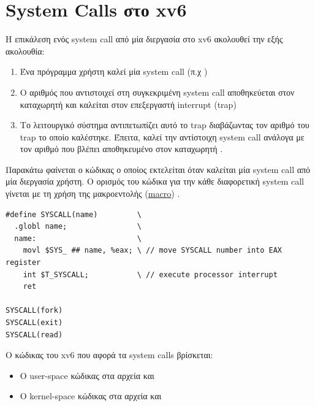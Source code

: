 \documentclass[18pt]{extarticle}
\begin{document}
\section{System Calls στο xv6}

Η επικάλεση ενός system call από μία διεργασία στο xv6 ακολουθεί την εξής ακολουθία:

\begin{enumerate}
    \item Ένα πρόγραμμα χρήστη καλεί μία system call (π.χ )
    \item Ο αριθμός που αντιστοιχεί στη συγκεκριμένη system call αποθηκεύεται στον καταχωρητή  και καλείται στον επεξεργαστή interrupt (trap) 
    \item Το λειτουργικό σύστημα αντιπετωπίζει αυτό το trap διαβάζωντας τον αριθμό του trap το οποίο καλέστηκε. Έπειτα, καλεί την αντίστοιχη system call ανάλογα 
        με τον αριθμό που βλέπει αποθηκευμένο στον καταχωρητή .
\end{enumerate}

Παρακάτω φαίνεται ο  κώδικας ο οποίος εκτελείται όταν καλείται μία system call από μία διεργασία χρήστη.
Ο ορισμός του κώδικα για την κάθε διαφορετική system call γίνεται με τη χρήση της μακροεντολής 
(\href{https://gcc.gnu.org/onlinedocs/cpp/Macros.html}{macro}) .

\begin{file}
\begin{verbatim}
#define SYSCALL(name)         \
  .globl name;                \
  name:                       \
    movl $SYS_ ## name, %eax; \ // move SYSCALL number into EAX register
    int $T_SYSCALL;           \ // execute processor interrupt
    ret

SYSCALL(fork)
SYSCALL(exit)
SYSCALL(read)
\end{verbatim}
\end{file}


\begin{info}[Σημείωση:]
    Ο κώδικας του xv6 που αφορά τα system calls βρίσκεται:

    \begin{itemize}
        \item Ο user-space κώδικας στα αρχεία  και 
        \item Ο kernel-space κώδικας στα αρχεία  και  
    \end{itemize}
\end{info}
\end{document}
